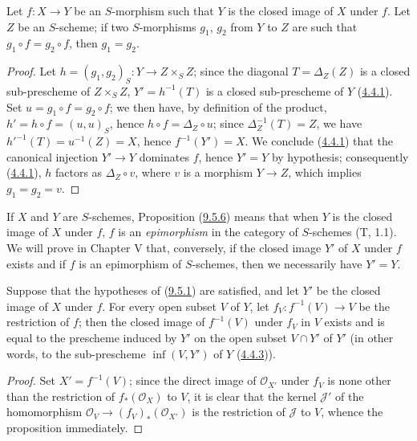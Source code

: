 \begin{corollary}[9.5.6]
\label{I.9.5.6}
Let $f:X\to Y$ be an $S$-morphism such that $Y$ is the closed image of $X$
under $f$. Let $Z$ be an $S$-scheme; if two $S$-morphisms $g_1$, $g_2$ from
$Y$ to $Z$ are such that $g_1\circ f=g_2\circ f$, then $g_1=g_2$.
\end{corollary}

\begin{proof}
Let $h=(g_1,g_2)_S:Y\to Z\times_S Z$; since the diagonal
$T=\Delta_Z(Z)$ is a closed sub-prescheme of $Z\times_S Z$,
$Y'=h^{-1}(T)$ is a closed sub-prescheme of $Y$
(\hyperref[I.4.4.1]{4.4.1}). Set $u=g_1\circ f=g_2\circ f$; we then
have, by definition of the product, $h'=h\circ f=(u,u)_S$, hence
$h\circ f=\Delta_Z\circ u$; since $\Delta_Z^{-1}(T)=Z$, we have
$h'^{-1}(T)=u^{-1}(Z)=X$, hence $f^{-1}(Y')=X$. We conclude
(\hyperref[I.4.4.1]{4.4.1}) that the canonical injection $Y'\to Y$
dominates $f$, hence $Y'=Y$ by hypothesis; consequently
(\hyperref[I.4.4.1]{4.4.1}), $h$ factors as $\Delta_Z\circ v$, where
$v$ is a morphism $Y\to Z$, which implies $g_1=g_2=v$.
\end{proof}

\begin{remark}[9.5.7]
\label{I.9.5.7}
If $X$ and $Y$ are $S$-schemes, Proposition
(\hyperref[I.9.5.6]{9.5.6}) means that
when $Y$ is the closed image of $X$ under $f$, $f$ is an
\emph{epimorphism} in the category of $S$-schemes (T, 1.1). We will prove
in Chapter V that, conversely, if the closed image $Y'$ of $X$ under $f$
exists and if $f$ is an epimorphism of $S$-schemes, then we necessarily
have $Y'=Y$.
\end{remark}

\begin{proposition}[9.5.8]
\label{I.9.5.8}
Suppose that the hypotheses of (\hyperref[I.9.5.1]{9.5.1}) are satisfied,
and let $Y'$ be the closed image of $X$ under $f$. For every open subset $V$
of $Y$, let $f_V:f^{-1}(V)\to V$ be the restriction of $f$; then the closed
image of $f^{-1}(V)$ under $f_V$ in $V$ exists and is equal to the
prescheme induced by $Y'$ on the open subset $V\cap Y'$ of $Y'$ (in other
words, to the sub-prescheme $\inf(V,Y')$ of $Y$
(\hyperref[I.4.4.3]{4.4.3})).
\end{proposition}

\begin{proof}
Set $X'=f^{-1}(V)$; since the direct image of $\mathscr{O}_{X'}$ under
$f_V$ is none other than the restriction of $f_*(\mathscr{O}_X)$ to $V$, it
is clear that the kernel $\mathscr{J}'$ of the homomorphism
$\mathscr{O}_V\to(f_V)_*(\mathscr{O}_{X'})$ is the restriction of
$\mathscr{J}$ to $V$, whence the proposition immediately.
\end{proof}

